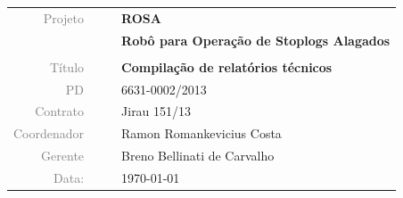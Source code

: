\vspace{4cm}

\begin{table}[ht!]
	\centering
	\begin{tabular}{r l|l p{12cm} }
		\textcolor{gray}{Projeto} &&& \textbf{\Large ROSA}\\
			&&& \textbf{Robô para Operação de Stoplogs Alagados}\\
			&&& \\
		\textcolor{gray}{Título} &&& \textbf{Compilação de relatórios técnicos}\\
		\textcolor{gray}{PD} &&& 6631-0002/2013 \\
		\textcolor{gray}{Contrato} &&& Jirau 151/13\\
		\textcolor{gray}{Coordenador} &&& Ramon Romankevicius Costa \\
		\textcolor{gray}{Gerente} &&& Breno Bellinati de Carvalho \\
		\textcolor{gray}{Data:} &&& \today \\
	\end{tabular}
\end{table}


\cleardoublepage


% 
% 
% 
%   
% 
% 
% 
% 
% 
% 
%     
% 
% 
% 
% 
% 
% 
% 

\hypersetup{pageanchor=true}

